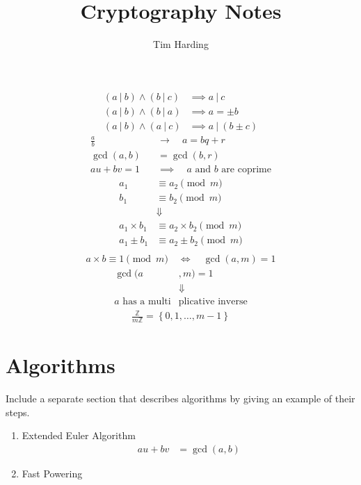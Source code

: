 \documentclass{article}
\title{Cryptography Notes}
\author{Tim Harding}
\newcommand{\curly}[1]{\left\{ #1 \right\}}
\begin{document}
\begin{multicols*}{2}

\begin{align*}
    (a\ |\ b) \wedge (b\ |\ c) &\implies a\ |\ c \\
    (a\ |\ b) \wedge (b\ |\ a) &\implies a = \pm b \\
    (a\ |\ b) \wedge (a\ |\ c) &\implies a\ |\ (b \pm c)
\end{align*}
\begin{align*}
    \frac{a}{b} \quad &\longrightarrow  \quad a = bq + r \\
    \gcd(a, b) &= \gcd(b, r) \\
    au + bv = 1 \quad &\implies \quad \text{$a$ and $b$ are coprime}
\end{align*}
\begin{align*}
    a_1 &\equiv a_2 \pmod{m} \\
    b_1 &\equiv b_2 \pmod{m} \\
    &\Downarrow \\
    a_1 \times b_1 &\equiv a_2 \times b_2 \pmod{m} \\
    a_1 \pm b_1 &\equiv a_2 \pm b_2 \pmod{m} \\
\end{align*}
\begin{align*}
    a \times b \equiv 1 \pmod{m} \quad \Leftrightarrow \quad \gcd(a, m) = 1
\end{align*}
\begin{align*}
    \gcd(a&, m) = 1 \\
    &\Downarrow \\
    \text{$a$ has a multi} & \text{plicative inverse}
\end{align*}
\begin{align*}
    \frac{\mathbb{Z}}{m\mathbb{Z}} = \curly{0, 1, \ldots, m - 1}
\end{align*}

\section*{Algorithms}
Include a separate section that describes algorithms by giving an example of their steps.
\begin{enumerate}
    \item Extended Euler Algorithm
        \begin{align*}
            au + bv &= \gcd(a, b)
        \end{align*}
    \item Fast Powering
\end{enumerate}

\end{multicols*}
\end{document}
